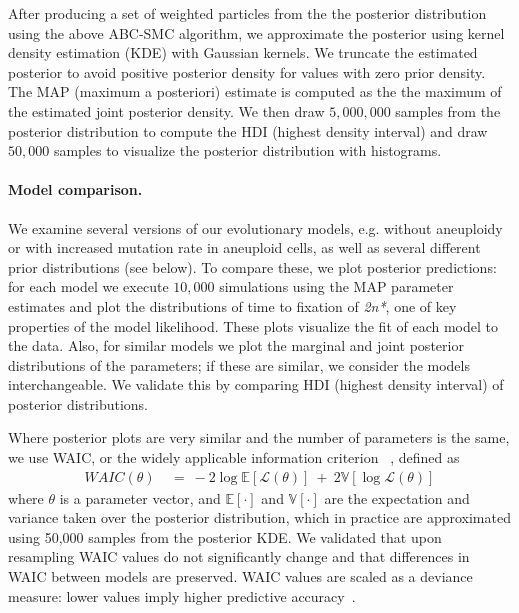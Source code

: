 \documentclass[12pt]{extarticle}
\newcommand{\likelihood}{\mathcal{L}}
\newcommand{\eumt}{\emph{2n*}}
\begin{document}
After producing a set of weighted particles from the the posterior distribution using the above ABC-SMC algorithm, we approximate the posterior using kernel density estimation (KDE) with Gaussian kernels. We truncate the estimated posterior to avoid positive posterior density for values with zero prior density. The MAP (maximum a posteriori) estimate is computed as the the maximum of the estimated joint posterior density. We then draw $5,000,000$ samples from the posterior distribution to compute the HDI (highest density interval) and draw $50,000$ samples to visualize the posterior distribution with histograms.

\paragraph{Model comparison.} 
We examine several versions of our evolutionary models, e.g. without aneuploidy or with increased mutation rate in aneuploid cells, as well as several different prior distributions (see below).
To compare these, we plot posterior predictions: for each model we execute $10,000$ simulations using the MAP parameter estimates and plot the distributions of time to fixation of \eumt, one of key properties of the model likelihood. These plots visualize the fit of each model to the data. 
Also, for similar models we plot the marginal and joint posterior distributions of the parameters; if these are similar, we consider the models interchangeable. We validate this by comparing HDI (highest density interval) of posterior distributions.

Where posterior plots are very similar and the number of parameters is the same, we use WAIC, or the widely applicable information criterion ~\citep{gelman2013bayesian}, defined as
\begin{equation} \label{eq:WAIC}
\begin{aligned}
\mathit{WAIC}(\theta) &\ =\ 
-2\log\mathbb{E}[\likelihood(\theta)]\ +\ 2\mathbb{V}[\log\likelihood(\theta)]
\end{aligned}
\end{equation}
where $\theta$ is a parameter vector, and $\mathbb{E}[\cdot]$ and $\mathbb{V}[\cdot]$ are the expectation and variance taken over the posterior distribution, which in practice are approximated using 50,000 samples from the posterior KDE. We validated that upon resampling WAIC values do not significantly change and that differences in WAIC between models are preserved.
WAIC values are scaled as a deviance measure: lower values imply higher predictive accuracy~\citep{Kass1995}.
 
\end{document}
